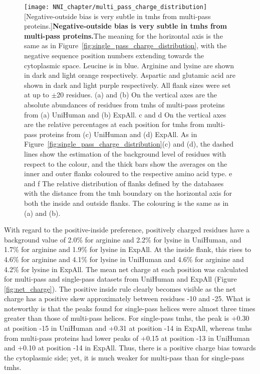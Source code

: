 \begin{figure}[!p]
\centering
\texttt{[image: NNI\_chapter/multi\_pass\_charge\_distribution]}
[Negative-outside bias is very subtle in \gls{tmh}s from multi-pass proteins.]{\textbf{Negative-outside bias is very subtle in \gls{tmh}s from multi-pass proteins.}The meaning for the horizontal axis is the same as in Figure~\ref{fig:single_pass_charge_distribution}, with the negative sequence position numbers extending towards the cytoplasmic space. Leucine is in blue. Arginine and lysine are shown in dark and light orange respectively. Aspartic and glutamic acid are shown in dark and light purple respectively. All flank sizes were set at up to $\pm$20 residues. (a) and (b) On the vertical axes are the absolute abundances of residues from \gls{tmh}s of multi-pass proteins from (a) UniHuman and (b) ExpAll. c and d On the vertical axes are the relative percentages at each position for \gls{tmh}s from multi-pass proteins from (c) UniHuman and (d) ExpAll. As in Figure~\ref{fig:single_pass_charge_distribution}(c) and (d), the dashed lines show the estimation of the background level of residues with respect to the colour, and the thick bars show the averages on the inner and outer flanks coloured to the respective amino acid type. e and f The relative distribution of flanks defined by the databases with the distance from the \gls{tmh} boundary on the horizontal axis for both the inside and outside flanks. The colouring is the same as in (a) and (b).}

\label{fig:multi_pass_charge_distribution}
\end{figure}

With regard to the positive-inside preference, positively charged residues have a background value of 2.0\% for arginine and 2.2\% for lysine in UniHuman, and 1.7\% for arginine and 1.9\% for lysine in ExpAll. At the inside flank, this rises to 4.6\% for arginine and 4.1\% for lysine in UniHuman and 4.6\% for arginine and 4.2\% for lysine in ExpAll. The mean net charge at each position was calculated for multi-pass and single-pass datasets from UniHuman and ExpAll (Figure \ref{fig:net_charge}). The positive inside rule clearly becomes visible as the net charge has a positive skew approximately between residues -10 and -25. What is noteworthy is that the peaks found for single-pass helices were almost three times greater than those of multi-pass helices. For single-pass \gls{tmh}s, the peak is +0.30 at position -15 in UniHuman and +0.31 at position -14 in ExpAll, whereas \gls{tmh}s from multi-pass proteins had lower peaks of +0.15 at position -13 in UniHuman and +0.10 at position -14 in ExpAll. Thus, there is a positive charge bias towards the cytoplasmic side; yet, it is much weaker for multi-pass than for single-pass \gls{tmh}s.

